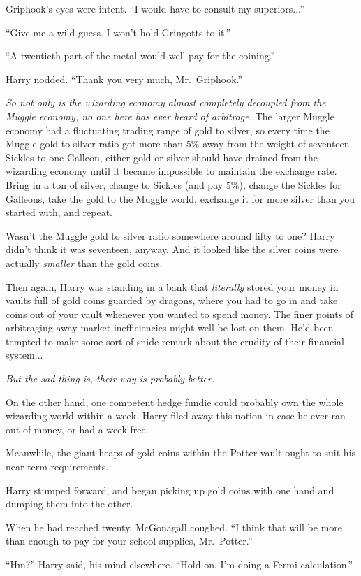 Griphook’s eyes were intent. “I would have to consult my superiors...”

“Give me a wild guess. I won’t hold Gringotts to it.”

“A twentieth part of the metal would well pay for the coining.”

Harry nodded. “Thank you very much, Mr.~Griphook.”

\emph{So not only is the wizarding economy almost completely decoupled from the Muggle economy, no one here has ever heard of arbitrage.} The larger Muggle economy had a fluctuating trading range of gold to silver, so every time the Muggle gold-to-silver ratio got more than 5\% away from the weight of seventeen Sickles to one Galleon, either gold or silver should have drained from the wizarding economy until it became impossible to maintain the exchange rate. Bring in a ton of silver, change to Sickles (and pay 5\%), change the Sickles for Galleons, take the gold to the Muggle world, exchange it for more silver than you started with, and repeat.

Wasn’t the Muggle gold to silver ratio somewhere around fifty to one? Harry didn’t think it was seventeen, anyway. And it looked like the silver coins were actually \emph{smaller} than the gold coins.

Then again, Harry was standing in a bank that \emph{literally} stored your money in vaults full of gold coins guarded by dragons, where you had to go in and take coins out of your vault whenever you wanted to spend money. The finer points of arbitraging away market inefficiencies might well be lost on them. He’d been tempted to make some sort of snide remark about the crudity of their financial system...

\emph{But the sad thing is, their way is probably better.}

On the other hand, one competent hedge fundie could probably own the whole wizarding world within a week. Harry filed away this notion in case he ever ran out of money, or had a week free.

Meanwhile, the giant heaps of gold coins within the Potter vault ought to suit his near-term requirements.

Harry stumped forward, and began picking up gold coins with one hand and dumping them into the other.

When he had reached twenty, McGonagall coughed. “I think that will be more than enough to pay for your school supplies, Mr.~Potter.”

“Hm?” Harry said, his mind elsewhere. “Hold on, I’m doing a Fermi calculation.”

